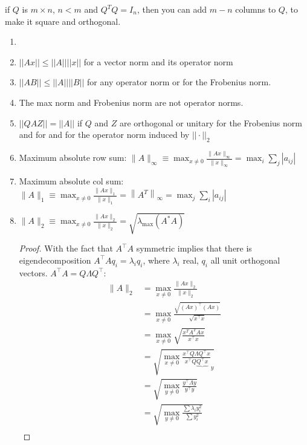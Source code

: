 \documentclass[11pt]{article}
\numberwithin{equation}{section}
\begin{document}
\begin{fact}
    if $Q$ is $ m \times n$, $n<m$ and $Q^{T} Q=I_{n}$, then you can add $m-n$ columns to $Q$, to make it square and orthogonal.
\end{fact}

\begin{lemma} %
    \begin{enumerate}
        \item[]
        \item $||Ax|| \leq ||A|| ||x||$ for a vector norm and its operator norm
        \item $||AB|| \leq ||A||||B||$ for any operator norm or for the Frobenius norm.
        \item The max norm and Frobenius norm are not operator norms.
        \item $||QAZ||=||A||$ if $Q$ and $Z$ are orthogonal or unitary for the Frobenius norm and for  and for the operator norm induced by $||\cdot||_2$
        \item Maximum absolute row sum: $\|A\|_{\infty} \equiv \max _{x\neq 0} \frac{\|A x\|_{\infty}}{\|x\|_{\infty}}=\max _{i} \sum_{j}\left|a_{i j}\right|$
        \item Maximum absolute col sum: $\|A\|_{1} \equiv \max _{x\neq 0} \frac{\|A x\|_{1}}{\|x\|_{1}}=\left\|A^{T}\right\|_{\infty}=\max _{j} \sum_{i}\left|a_{i j}\right|$
        \item $\|A\|_{2} \equiv \max _{x\neq 0} \frac{\|A x\|_{2}}{\|x\|_{2}}=\sqrt{\lambda_{\max }\left(A^{*} A\right)}$
        \begin{proof}
            With the fact that $A^\top A$ symmetric implies that there is eigendecomposition $A^\top Aq_i=\lambda_iq_i$, where $\lambda_i$ real, 
            $q_i$ all unit orthogonal vectors. $A^{\top}A=Q\Lambda Q^{\top}$:
            \begin{align*}
                \|A \|_{2} &= \max _{x\neq 0} \frac{\|A x\|_{2}}{\|x\|_{2}} \\
                &= \max _{x\neq 0}\frac{\sqrt{(A x)^{\top}(A x)}}{\sqrt{x^{\top} x}} \\
                &= \max _{x\neq 0} \sqrt{\frac{x^{T} A^{T} A x}{x^{\top} x}} \\
                &= \sqrt{\max _{x \neq 0} \frac{x^{\top} Q\Lambda Q^{\top} x}{x^{\top} Q \underbrace{Q^{\top} x}}_{y}} \\
                &= \sqrt{\max _{y \neq 0} \frac{y^{\top}\Lambda y}{y^{\top} y}} \\
                &= \sqrt{\max _{y \neq 0} \frac{\sum \lambda_{i} y_i^2}{\sum y_i^2}} \\

\end{align*}
\end{proof}
\end{enumerate}
\end{lemma}
\end{document}
